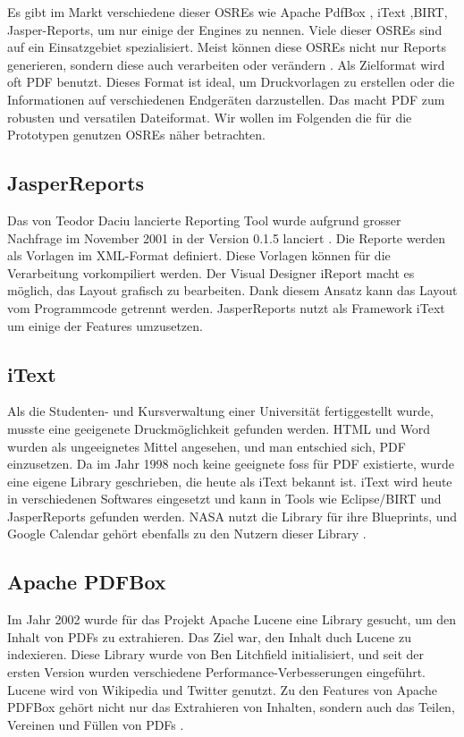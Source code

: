 \documentclass[main.tex]{subfiles}
\begin{document}
Es gibt im Markt verschiedene dieser OSREs wie Apache PdfBox , iText ,BIRT, Jasper-Reports, um nur einige der Engines zu nennen. Viele dieser OSREs sind auf ein Einsatzgebiet spezialisiert. Meist können diese OSREs nicht nur Reports generieren, sondern diese auch verarbeiten oder verändern \cite[Kap. ~10]{whitington_2012}. Als Zielformat wird oft PDF benutzt. Dieses Format ist ideal, um Druckvorlagen zu erstellen oder die Informationen auf verschiedenen Endgeräten darzustellen. Das macht PDF zum robusten und versatilen Dateiformat. Wir wollen im Folgenden die für die Prototypen genutzen OSREs näher betrachten.


\subsection{JasperReports\textregistered}
Das von Teodor Daciu lancierte Reporting Tool wurde aufgrund grosser Nachfrage im November 2001 in der Version 0.1.5 lanciert \cite[Kap.~1]{heffelfinger_2009}. Die Reporte werden als Vorlagen im XML-Format definiert. Diese Vorlagen können für die Verarbeitung vorkompiliert werden. Der Visual Designer iReport macht es möglich, das Layout grafisch zu bearbeiten. Dank diesem Ansatz kann das Layout vom Programmcode getrennt werden. JasperReports nutzt als Framework iText um einige der Features umzusetzen. 


\subsection{iText}
Als die Studenten- und Kursverwaltung einer Universität fertiggestellt wurde, musste eine geeigenete Druckmöglichkeit gefunden werden. HTML und Word wurden als ungeeignetes Mittel angesehen, und man entschied sich, PDF einzusetzen. Da im Jahr 1998 noch keine geeignete \acrshort{foss} für PDF existierte, wurde eine eigene Library geschrieben, die heute als iText bekannt ist. iText wird heute in verschiedenen Softwares eingesetzt und kann in Tools wie Eclipse/BIRT und JasperReports gefunden werden. NASA nutzt die Library für ihre Blueprints, und Google Calendar gehört ebenfalls zu den Nutzern dieser Library \cite[Kap.~1]{lowagie_2010}.

\subsection{Apache PDFBox}
Im Jahr 2002 wurde für das Projekt Apache Lucene eine Library gesucht, um den Inhalt von PDFs zu extrahieren. Das Ziel war, den Inhalt duch Lucene zu indexieren. Diese Library wurde von Ben Litchfield initialisiert, und seit der ersten Version wurden verschiedene Performance-Verbesserungen eingeführt. Lucene wird von Wikipedia und Twitter genutzt. Zu den Features von Apache PDFBox gehört nicht nur das Extrahieren von Inhalten, sondern auch das Teilen, Vereinen und Füllen von PDFs \cite{apachepdfbox_history}.
\end{document}
